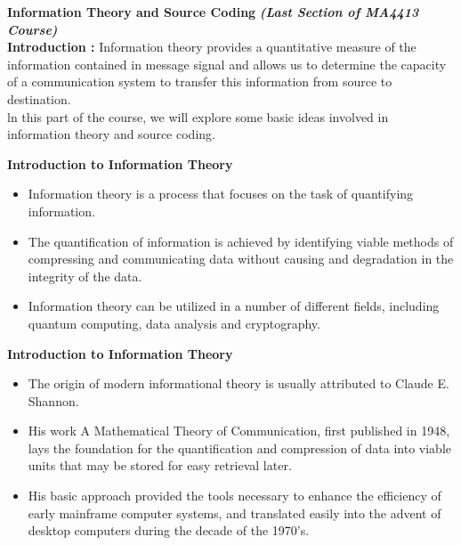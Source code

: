 \documentclass[]{article}
\title{}
\author{}
\begin{document}
\noindent \textbf{Information Theory and Source Coding}
\textbf{\textit{(Last Section of MA4413 Course)}}\\
\bigskip
\textbf{Introduction : } Information theory provides a quantitative measure of the information contained in message signal and allows us to determine the capacity of a communication system to transfer this information from source to destination. \\ \bigskip ln this part of the course, we will explore some basic ideas involved in information theory and source coding.




\noindent \textbf{Introduction to Information Theory}
\begin{itemize}
\item Information theory is a process that focuses on the task of quantifying information. 
\item The quantification of information is achieved by identifying viable methods of compressing and communicating data without causing 
and degradation in the integrity of the data. 
\item Information theory can be utilized in a number of different fields, including quantum computing, 
data analysis and cryptography.
\end{itemize}


\noindent \textbf{Introduction to Information Theory}
\begin{itemize}
\item The origin of modern informational theory is usually attributed to Claude E. Shannon.
\item His work A Mathematical Theory of Communication, first published in 1948, 
lays the foundation for the quantification and compression of data into viable units that may be stored for easy retrieval later. 
\item His basic approach provided the tools necessary to enhance the efficiency of early mainframe computer systems, and translated easily into 
the advent of desktop computers during the decade of the 1970’s.
\end{itemize}

\end{document}
